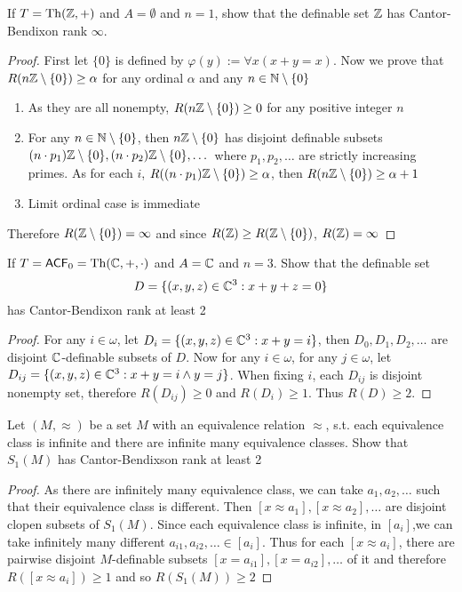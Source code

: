 \documentclass[11pt]{article}
\begin{document}
\begin{exercise}
If \(T=\operatorname{Th}(\mathbb{Z},+)\) and \(A=\emptyset\) and \(n=1\), show that the definable set \(\mathbb{Z}\) has Cantor-Bendixon
rank \(\infty\).
\end{exercise}

\begin{proof}
First let \(\{0\}\) is defined by \(\varphi(y):=\forall x(x+y=x)\). Now we prove that \(R(n\mathbb{Z}\setminus\{0\})\ge\alpha\) for any ordinal
\(\alpha\) and any \(n\in\mathbb{N}\setminus\{0\}\)
\begin{enumerate}
\item As they are all nonempty, \(R(n\mathbb{Z}\setminus\{0\})\ge 0\) for any positive integer \(n\)
\item For any \(n\in\mathbb{N}\setminus\{0\}\), then \(n\mathbb{Z}\setminus\{0\}\) has disjoint definable subsets \((n\cdot p_1)\mathbb{Z}\setminus\{0\},(n\cdot p_2)\mathbb{Z}\setminus\{0\},\dots\)
where \(p_1,p_2,\dots\) are strictly increasing primes. As for each \(i\), \(R((n\cdot p_1)\mathbb{Z}\setminus\{0\})\ge\alpha\), then
\(R(n\mathbb{Z}\setminus\{0\})\ge\alpha+1\)
\item Limit ordinal case is immediate
\end{enumerate}


Therefore \(R(\mathbb{Z}\setminus\{0\})=\infty\) and since \(R(\mathbb{Z})\ge R(\mathbb{Z}\setminus\{0\})\), \(R(\mathbb{Z})=\infty\)
\end{proof}

\begin{exercise}
If \(T=\textsf{ACF}_0=\operatorname{Th}(\mathbb{C},+,\cdot)\) and \(A=\mathbb{C}\) and \(n=3\). Show that the definable set
\begin{equation*}
D=\{(x,y,z)\in\mathbb{C}^3:x+y+z=0\}
\end{equation*}
has Cantor-Bendixon rank at least 2
\end{exercise}

\begin{proof}
For any \(i\in\omega\), let \(D_{i}=\{(x,y,z)\in\mathbb{C}^3:x+y=i\}\), then \(D_0,D_1,D_2,\dots\) are disjoint \(\mathbb{C}\)-definable
subsets of \(D\). Now for any \(i\in\omega\), for any \(j\in\omega\), let \(D_{ij}=\{(x,y,z)\in\mathbb{C}^3:x+y=i\wedge y=j\}\). When
fixing \(i\), each \(D_{ij}\) is disjoint nonempty set, therefore \(R(D_{ij})\ge 0\) and \(R(D_i)\ge 1\).
Thus \(R(D)\ge 2\).
\end{proof}

\begin{exercise}
Let \((M,\approx)\) be a set \(M\) with an equivalence relation \(\approx\), s.t. each equivalence class is
infinite and there are infinite many equivalence classes. Show that \(S_1(M)\) has Cantor-Bendixson
rank at least 2
\end{exercise}

\begin{proof}
As there are infinitely many equivalence class, we can take \(a_1,a_2,\dots\) such that their equivalence
class is different. Then \([x\approx a_1],[x\approx a_2],\dots\) are disjoint clopen subsets of \(S_1(M)\). Since each
equivalence class is infinite, in \([a_i]\),we can take infinitely many
different \(a_{i1},a_{i2},\dots\in [a_i]\). Thus for each \([x\approx a_i]\), there are pairwise
disjoint \(M\)-definable subsets \([x=a_{i1}],[x=a_{i2}],\dots\) of it and therefore \(R([x\approx a_i])\ge 1\)
and so \(R(S_1(M))\ge 2\)
\end{proof}
\end{document}
